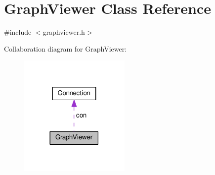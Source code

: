 \hypertarget{classGraphViewer}{}\section{Graph\+Viewer Class Reference}
\label{classGraphViewer}


{\ttfamily \#include $<$graphviewer.\+h$>$}



Collaboration diagram for Graph\+Viewer\+:
\nopagebreak
\begin{figure}[H]
\begin{center}
\leavevmode
\includegraphics[width=153pt]{classGraphViewer__coll__graph}
\end{center}
\end{figure}
